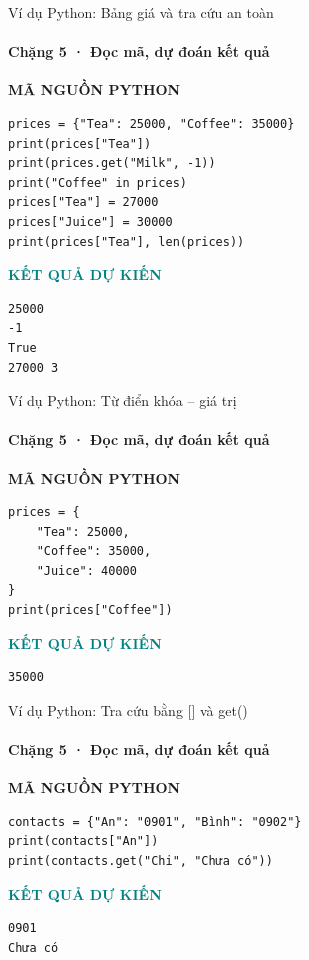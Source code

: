 \documentclass[aspectratio=169,10pt]{beamer}
\begin{document}
\begin{frame}[fragile,t]{Ví dụ Python: Bảng giá và tra cứu an toàn}
\framesubtitle{Chặng 5 · Đọc mã, dự đoán kết quả}
\vspace{-1mm}
{\small\color{muted}\textbf{MÃ NGUỒN PYTHON}}\par\vspace{1mm}
\begin{Verbatim}[fontsize=\scriptsize,frame=single,framesep=4mm,rulecolor=\color{teal!35},breaklines=true]
prices = {"Tea": 25000, "Coffee": 35000}
print(prices["Tea"])
print(prices.get("Milk", -1))
print("Coffee" in prices)
prices["Tea"] = 27000
prices["Juice"] = 30000
print(prices["Tea"], len(prices))
\end{Verbatim}
\vspace{1mm}\textcolor{teal}{\scriptsize\textbf{KẾT QUẢ DỰ KIẾN}}
\begin{Verbatim}[fontsize=\scriptsize,breaklines=true]
25000
-1
True
27000 3
\end{Verbatim}

\end{frame}

\begin{frame}[fragile,t]{Ví dụ Python: Từ điển khóa – giá trị}
\framesubtitle{Chặng 5 · Đọc mã, dự đoán kết quả}
\vspace{-1mm}
{\small\color{muted}\textbf{MÃ NGUỒN PYTHON}}\par\vspace{1mm}
\begin{Verbatim}[fontsize=\scriptsize,frame=single,framesep=4mm,rulecolor=\color{teal!35},breaklines=true]
prices = {
    "Tea": 25000,
    "Coffee": 35000,
    "Juice": 40000
}
print(prices["Coffee"])
\end{Verbatim}
\vspace{1mm}\textcolor{teal}{\scriptsize\textbf{KẾT QUẢ DỰ KIẾN}}
\begin{Verbatim}[fontsize=\scriptsize,breaklines=true]
35000
\end{Verbatim}

\end{frame}

\begin{frame}[fragile,t]{Ví dụ Python: Tra cứu bằng [] và get()}
\framesubtitle{Chặng 5 · Đọc mã, dự đoán kết quả}
\vspace{-1mm}
{\small\color{muted}\textbf{MÃ NGUỒN PYTHON}}\par\vspace{1mm}
\begin{Verbatim}[fontsize=\scriptsize,frame=single,framesep=4mm,rulecolor=\color{teal!35},breaklines=true]
contacts = {"An": "0901", "Bình": "0902"}
print(contacts["An"])
print(contacts.get("Chi", "Chưa có"))
\end{Verbatim}
\vspace{1mm}\textcolor{teal}{\scriptsize\textbf{KẾT QUẢ DỰ KIẾN}}
\begin{Verbatim}[fontsize=\scriptsize,breaklines=true]
0901
Chưa có
\end{Verbatim}

\end{frame}
\end{document}
